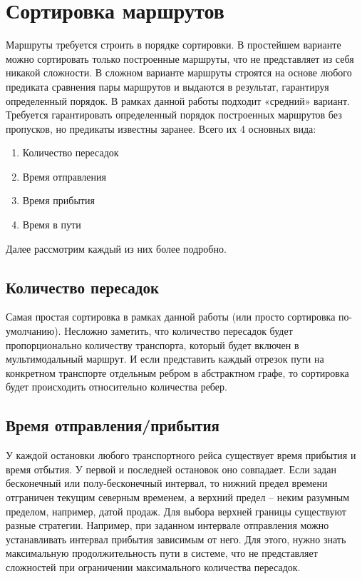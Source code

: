 \section{Сортировка маршрутов}
Маршруты требуется строить в порядке сортировки. В простейшем варианте можно сортировать только построенные маршруты, что не представляет из себя никакой сложности. В сложном варианте маршруты строятся на основе любого предиката сравнения пары маршрутов и выдаются в результат, гарантируя определенный порядок. В рамках данной работы подходит «средний» вариант. Требуется гарантировать определенный порядок построенных маршрутов без пропусков, но предикаты известны заранее. Всего их 4 основных вида:
\begin{enumerate}
    \item Количество пересадок
    \item Время отправления
    \item Время прибытия
    \item Время в пути
\end{enumerate}

Далее рассмотрим каждый из них более подробно.

\subsection{Количество пересадок}
Самая простая сортировка в рамках данной работы (или просто сортировка по-умолчанию). Несложно заметить, что количество пересадок будет пропорционально количеству транспорта, который будет включен в мультимодальный маршрут. И если представить каждый отрезок пути на конкретном транспорте отдельным ребром в абстрактном графе, то сортировка будет происходить относительно количества ребер.

\subsection{Время отправления/прибытия}
У каждой остановки любого транспортного рейса существует время прибытия и время отбытия. У первой и последней остановок оно совпадает. Если задан бесконечный или полу-бесконечный интервал, то нижний предел времени отграничен текущим северным временем, а верхний предел -- неким разумным пределом, например, датой продаж. Для выбора верхней границы существуют разные стратегии. Например, при заданном интервале отправления можно устанавливать интервал прибытия зависимым от него. Для этого, нужно знать максимальную продолжительность пути в системе, что не представляет сложностей при ограничении максимального количества пересадок.

